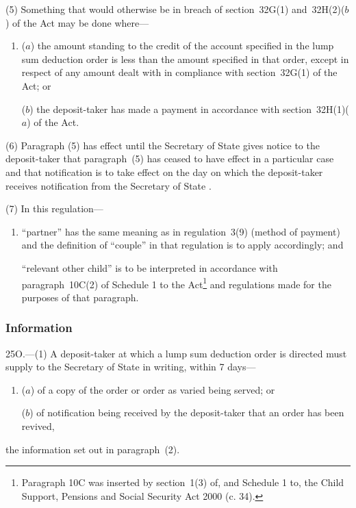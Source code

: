 \documentclass[12pt,a4paper]{article}
\begin{document}
(5) Something that would otherwise be in breach of section~32G(1) and~32H(2)($b$)  of the Act may be done where—
\begin{enumerate}\item[]
($a$) the amount standing to the credit of the account specified in the lump sum deduction order is less than the amount specified in that order, except in respect of any amount dealt with in compliance with section~32G(1) of the Act; or

($b$) the deposit-taker has made a payment in accordance with section~32H(1)($a$)  of the Act.
\end{enumerate}

(6) Paragraph (5) has effect until the 
Secretary of State  %
gives notice to the deposit-taker that paragraph~(5) has ceased to have effect in a particular case and that notification is to take effect on the day on which the deposit-taker receives notification from the 
Secretary of State%
.

(7) In this regulation—
\begin{enumerate}\item[]
\begin{sloppypar}
“partner” has the same meaning as in regulation~3(9) (method of payment) and the definition of “couple” in that regulation is to apply accordingly; and
\end{sloppypar}

“relevant other child” is to be interpreted in accordance with paragraph~10C(2) of Schedule 1 to the Act\footnote{Paragraph 10C was inserted by section~1(3) of, and Schedule 1 to, the Child Support, Pensions and Social Security Act 2000 (c. 34).} and regulations made for the purposes of that paragraph.
\end{enumerate}


\subsubsection[25O. Information]{Information}

25O.---(1)  A deposit-taker at which a lump sum deduction order is directed must supply to the 
Secretary of State  %
in writing, within 7 days—
\begin{enumerate}\item[]
($a$) of a copy of the order or order as varied being served; or

($b$) of notification being received by the deposit-taker that an order has been revived,
\end{enumerate}
the information set out in paragraph~(2).
\end{document}
